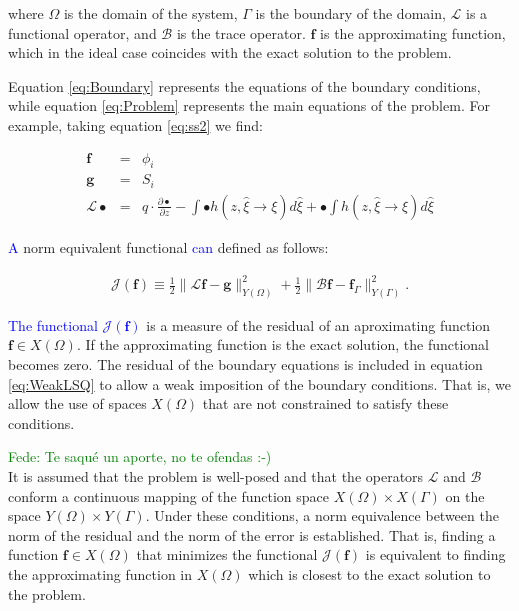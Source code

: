 \documentclass{CFD2011}
\newcommand{\Fede}[1]{\textcolor{green}{Fede: #1} \\}
\newcommand{\Pablo}[1]{\textcolor{blue}{#1}}
\begin{document}
\noindent where $\Omega$ is the domain of the system, $\Gamma$ is the boundary of the domain, $\mathcal{L}$ is a functional operator, and $\mathcal{B}$ is the trace operator. $\mathbf{f}$ is the approximating function, which in the ideal case coincides with the exact solution to the problem.

Equation \ref{eq:Boundary} represents the equations of the boundary conditions, while  equation \ref{eq:Problem} represents the main equations of the problem. 
For example, taking equation \ref{eq:ss2} we find:

\begin{eqnarray}
\mathbf{f}&=&\phi_i \nonumber \\
\mathbf{g}&=&S_i \label{eq:problem} \\
\mathcal{L}\bullet&=& q \cdot \frac{\partial \bullet}{\partial z} - \int \bullet h(z, \hat \xi \rightarrow \xi) d\hat \xi +\bullet\int h(z, \hat \xi \rightarrow \xi) d\hat \xi \nonumber
\end{eqnarray}

\Pablo{A} norm equivalent functional \Pablo{can} defined as follows:

\begin{eqnarray} 
\mathcal{J}(\mathbf{f})\equiv  \frac{1}{2}\parallel \mathcal{L} \mathbf{f} -\mathbf{g} \parallel_{Y(\Omega)}^2 + \frac{1}{2} \parallel \mathcal{B}\mathbf{f} - \mathbf{f}_{\Gamma} \parallel_{Y(\Gamma)}^2. 
\label{eq:WeakLSQ}
\end{eqnarray}

\Pablo{The functional $\mathcal{J}(\mathbf{f})$} is a measure of the residual of an aproximating function $\mathbf{f}\in X(\Omega)$. If the approximating function is the exact solution, the functional becomes zero.
The residual of the boundary equations is included in equation \ref{eq:WeakLSQ} to allow a weak imposition of the boundary conditions. That is, we allow the use of spaces $X(\Omega)$ that are not constrained to satisfy these conditions. 

\Fede{Te saqu\'e un aporte, no te ofendas :-)}

It is assumed that the problem is well-posed and that the operators $\mathcal{L}$ and $\mathcal{B}$ conform a continuous mapping of the function space $X(\Omega)\times X(\Gamma)$ on the space $Y(\Omega) \times Y(\Gamma)$. Under these conditions, a norm equivalence between the norm of the residual and the norm of the error is established. That is, finding a function $\mathbf{f}\in X(\Omega)$ that minimizes the functional $\mathcal{J}(\mathbf{f})$ is equivalent to finding the approximating function in $X(\Omega)$ which is closest to the exact solution to the problem. 
\end{document}
